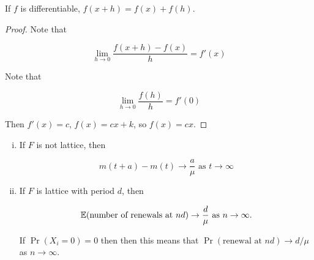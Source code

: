 \begin{lemma}
If \(f\) is differentiable, \(f(x+h) = f(x) + f(h)\).
\end{lemma}

\begin{proof}

Note that

\[
\lim_{h \to 0} \frac{f(x+h) - f(x)}{h} = f'(x) 
\]

Note that

\[
 \lim_{h \to 0} \frac{f(h)}{h} = f'(0)
\]

Then \(f'(x) = c\), \(f(x) = cx + k\), so \(f(x) = cx\).

\end{proof}

\begin{theorem}


\begin{enumerate}[(i)]

\item If \(F\) is not lattice, then 

\[
m(t+a) - m(t) \to \frac{a}{\mu} \text{ as } t \to \infty
\]

\item If \(F\) is lattice with period \(d\), then 

\[
\E( \text{number of renewals at } nd) \to \frac{d}{\mu} \text{ as } n \to \infty.
\]

\begin{remark}If \(\Pr(X_i = 0) = 0\) then then this means that \(\Pr(\text{renewal at } nd) \to d/\mu\) as \(n \to \infty\).

\end{remark}

\end{enumerate}
\end{theorem}

